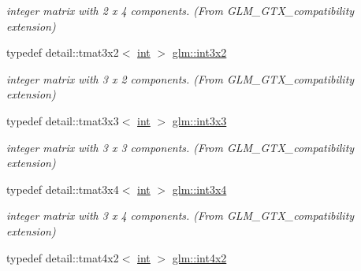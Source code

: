 \begin{DoxyCompactItemize}
\begin{DoxyCompactList}\small\item\em integer matrix with 2 x 4 components. (From G\+L\+M\+\_\+\+G\+T\+X\+\_\+compatibility extension) \end{DoxyCompactList}\item 
\hypertarget{group__gtx__compatibility_ga8687f67c7a0a0f7b412ba63f04c56486}{}typedef detail\+::tmat3x2$<$ \hyperlink{_s_d_l__thread_8h_a6a64f9be4433e4de6e2f2f548cf3c08e}{int} $>$ \hyperlink{group__gtx__compatibility_ga8687f67c7a0a0f7b412ba63f04c56486}{glm\+::int3x2}\label{group__gtx__compatibility_ga8687f67c7a0a0f7b412ba63f04c56486}

\begin{DoxyCompactList}\small\item\em integer matrix with 3 x 2 components. (From G\+L\+M\+\_\+\+G\+T\+X\+\_\+compatibility extension) \end{DoxyCompactList}\item 
\hypertarget{group__gtx__compatibility_ga267450aec15439e4322851282c6ca5b3}{}typedef detail\+::tmat3x3$<$ \hyperlink{_s_d_l__thread_8h_a6a64f9be4433e4de6e2f2f548cf3c08e}{int} $>$ \hyperlink{group__gtx__compatibility_ga267450aec15439e4322851282c6ca5b3}{glm\+::int3x3}\label{group__gtx__compatibility_ga267450aec15439e4322851282c6ca5b3}

\begin{DoxyCompactList}\small\item\em integer matrix with 3 x 3 components. (From G\+L\+M\+\_\+\+G\+T\+X\+\_\+compatibility extension) \end{DoxyCompactList}\item 
\hypertarget{group__gtx__compatibility_ga249f25c2a60757d6e536e29a3aa6fbaf}{}typedef detail\+::tmat3x4$<$ \hyperlink{_s_d_l__thread_8h_a6a64f9be4433e4de6e2f2f548cf3c08e}{int} $>$ \hyperlink{group__gtx__compatibility_ga249f25c2a60757d6e536e29a3aa6fbaf}{glm\+::int3x4}\label{group__gtx__compatibility_ga249f25c2a60757d6e536e29a3aa6fbaf}

\begin{DoxyCompactList}\small\item\em integer matrix with 3 x 4 components. (From G\+L\+M\+\_\+\+G\+T\+X\+\_\+compatibility extension) \end{DoxyCompactList}\item 
\hypertarget{group__gtx__compatibility_ga39cdfa1a5e503bdf320783f4e5eaf534}{}typedef detail\+::tmat4x2$<$ \hyperlink{_s_d_l__thread_8h_a6a64f9be4433e4de6e2f2f548cf3c08e}{int} $>$ \hyperlink{group__gtx__compatibility_ga39cdfa1a5e503bdf320783f4e5eaf534}{glm\+::int4x2}\label{group__gtx__compatibility_ga39cdfa1a5e503bdf320783f4e5eaf534}


\end{DoxyCompactItemize}
